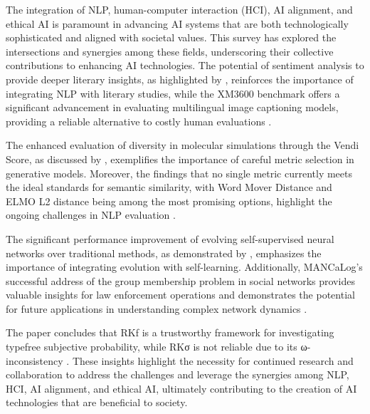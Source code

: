The integration of NLP, human-computer interaction (HCI), AI alignment, and ethical AI is paramount in advancing AI systems that are both technologically sophisticated and aligned with societal values. This survey has explored the intersections and synergies among these fields, underscoring their collective contributions to enhancing AI technologies. The potential of sentiment analysis to provide deeper literary insights, as highlighted by \cite{jannidis2016analyzingfeaturesdetectionhappy}, reinforces the importance of integrating NLP with literary studies, while the XM3600 benchmark offers a significant advancement in evaluating multilingual image captioning models, providing a reliable alternative to costly human evaluations \cite{thapliyal2022crossmodal3600massivelymultilingualmultimodal}.



The enhanced evaluation of diversity in molecular simulations through the Vendi Score, as discussed by \cite{pasarkar2024cousinsvendiscorefamily}, exemplifies the importance of careful metric selection in generative models. Moreover, the findings that no single metric currently meets the ideal standards for semantic similarity, with Word Mover Distance and ELMO L2 distance being among the most promising options, highlight the ongoing challenges in NLP evaluation \cite{yamshchikov2020styletransferparaphraselookingsensible}.



The significant performance improvement of evolving self-supervised neural networks over traditional methods, as demonstrated by \cite{le2019evolvingselfsupervisedneuralnetworks}, emphasizes the importance of integrating evolution with self-learning. Additionally, MANCaLog's successful address of the group membership problem in social networks provides valuable insights for law enforcement operations and demonstrates the potential for future applications in understanding complex network dynamics \cite{shakarian2022reasoningcomplexnetworkslogic}.



The paper concludes that RKf is a trustworthy framework for investigating typefree subjective probability, while RKσ is not reliable due to its ω-inconsistency \cite{cieslinski2022axiomstypefreesubjectiveprobability}. These insights highlight the necessity for continued research and collaboration to address the challenges and leverage the synergies among NLP, HCI, AI alignment, and ethical AI, ultimately contributing to the creation of AI technologies that are beneficial to society.
